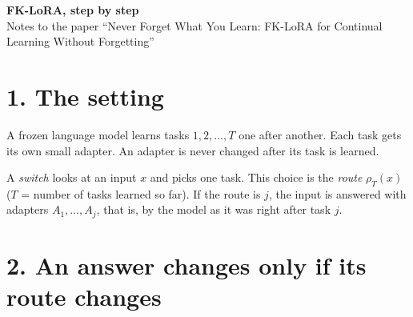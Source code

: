 \documentclass[11pt,a4paper]{article}
\begin{document}
\begin{center}
{\Large\bfseries FK-LoRA, step by step}\\[3pt]
{\small Notes to the paper ``Never Forget What You Learn: FK-LoRA for Continual Learning Without Forgetting''}
\end{center}

\section*{1. The setting}

A frozen language model learns tasks $1, 2, \dots, T$ one after another. Each task gets its own
small adapter. An adapter is never changed after its task is learned.

\begin{center}
\end{center}

A \emph{switch} looks at an input $x$ and picks one task. This choice is the \emph{route} $\rho_T(x)$
($T$ = number of tasks learned so far). If the route is $j$, the input is answered with adapters
$A_1,\dots,A_j$, that is, by the model as it was right after task $j$.

\begin{center}
\end{center}

\section*{2. An answer changes only if its route changes}
\end{document}
